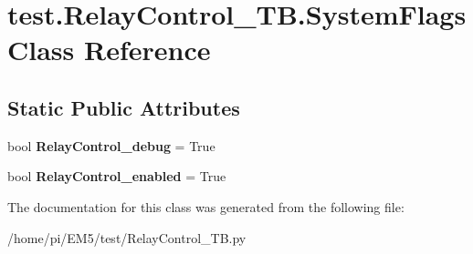 \hypertarget{classtest_1_1RelayControl__TB_1_1SystemFlags}{}\section{test.\+Relay\+Control\+\_\+\+T\+B.\+System\+Flags Class Reference}
\label{classtest_1_1RelayControl__TB_1_1SystemFlags}
\subsection*{Static Public Attributes}
\begin{DoxyCompactItemize}
\item 
\mbox{\label{classtest_1_1RelayControl__TB_1_1SystemFlags_a413c22b9066f90246e2d165d2f28de8f}} 
bool {\bfseries Relay\+Control\+\_\+debug} = True
\item 
\mbox{\label{classtest_1_1RelayControl__TB_1_1SystemFlags_a854a477ac1cfa60472341fab0cbdac9f}} 
bool {\bfseries Relay\+Control\+\_\+enabled} = True
\end{DoxyCompactItemize}


The documentation for this class was generated from the following file\+:\begin{DoxyCompactItemize}
\item 
/home/pi/\+E\+M5/test/Relay\+Control\+\_\+\+T\+B.\+py\end{DoxyCompactItemize}
